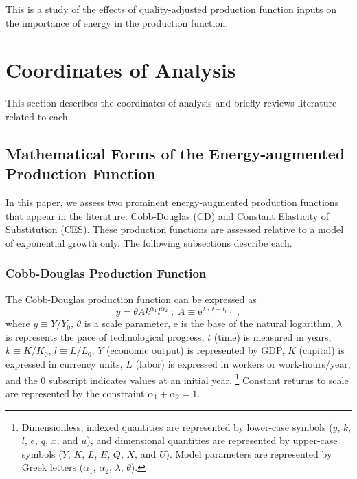 \documentclass[preprint,authoryear,12pt]{elsarticle}\usepackage[]{graphicx}\usepackage[]{color}
\begin{document}
This is a study of the effects of quality-adjusted production function inputs
on the importance of energy in the production function.


\section{Coordinates of Analysis} 
\label{sec:Coordinates}

This section describes the coordinates of analysis and briefly reviews 
literature related to each.


\subsection{Mathematical Forms of the Energy-augmented Production Function} 
\label{sec:Prod_Func_Forms}

In this paper, we assess two prominent energy-augmented production functions 
that appear in the literature: 
Cobb-Douglas (CD) and
Constant Elasticity of Substitution (CES).
These production functions are assessed relative to 
a model of exponential growth only.
The following subsections describe each.


\subsubsection{Cobb-Douglas Production Function} 
\label{sec:CDe}

The Cobb-Douglas production function can be expressed as
%
\begin{equation} \label{eq:CD}
  y = \theta A k^{\alpha_1} l^{\alpha_2} \; ; \; A \equiv \mathrm{e}^{\lambda(t-t_0)} \; ,
\end{equation}
%
where 
$y \equiv Y/Y_{0}$,
$\theta$ is a scale parameter,
e is the base of the natural logarithm, 
$\lambda$ is represents the pace of technological progress,
$t$ (time) is measured in years,
$k \equiv K/K_{0}$, 
$l \equiv L/L_{0}$, 
$Y$ (economic output) is represented by GDP, 
$K$ (capital) is expressed in currency units, 
$L$ (labor) is expressed in workers or work-hours/year, and
the 0 subscript indicates values at an initial year.%
  \footnote{Dimensionless, indexed quantities are represented by 
  lower-case symbols 
  ($y$, $k$, $l$, $e$, $q$, $x$, and $u$), and dimensional 
  quantities are represented by upper-case symbols 
  ($Y$, $K$, $L$, $E$, $Q$, $X$, and $U$). 
  Model parameters are represented by Greek letters
  ($\alpha_1$, $\alpha_2$, $\lambda$, $\theta$).
  }
Constant returns to scale are represented by the constraint
$\alpha_1 + \alpha_2 = 1$.
\end{document}
